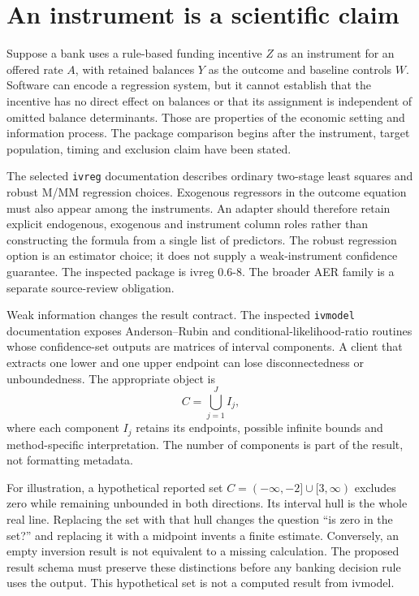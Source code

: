 \section{An instrument is a scientific claim}

Suppose a bank uses a rule-based funding incentive \(Z\) as an instrument for
an offered rate \(A\), with retained balances \(Y\) as the outcome and baseline
controls \(W\). Software can encode a regression system, but it cannot establish
that the incentive has no direct effect on balances or that its assignment is
independent of omitted balance determinants. Those are properties of the
economic setting and information process. The package comparison begins after
the instrument, target population, timing and exclusion claim have been stated.

The selected \texttt{ivreg} documentation describes ordinary two-stage least
squares and robust M/MM regression choices. Exogenous regressors in the outcome
equation must also appear among the instruments. An adapter should therefore
retain explicit endogenous, exogenous and instrument column roles rather than
constructing the formula from a single list of predictors. The robust regression
option is an estimator choice; it does not supply a weak-instrument confidence
guarantee. The inspected package is ivreg 0.6-8. The broader AER family is a
separate source-review obligation.\cite{ivreg}

Weak information changes the result contract. The inspected \texttt{ivmodel}
documentation exposes Anderson--Rubin and conditional-likelihood-ratio routines
whose confidence-set outputs are matrices of interval components. A client
that extracts one lower and one upper endpoint can lose disconnectedness or
unboundedness. The appropriate object is
\[
 C=\bigcup_{j=1}^{J} I_j,
\]
where each component \(I_j\) retains its endpoints, possible infinite bounds and
method-specific interpretation. The number of components is part of the result,
not formatting metadata.\cite{ivmodel}

For illustration, a hypothetical reported set
\(C=(-\infty,-2]\cup[3,\infty)\) excludes zero while remaining unbounded in both
directions. Its interval hull is the whole real line. Replacing the set with
that hull changes the question ``is zero in the set?'' and replacing it with a
midpoint invents a finite estimate. Conversely, an empty inversion result is
not equivalent to a missing calculation. The proposed result schema must
preserve these distinctions before any banking decision rule uses the output.
This hypothetical set is not a computed result from ivmodel.

